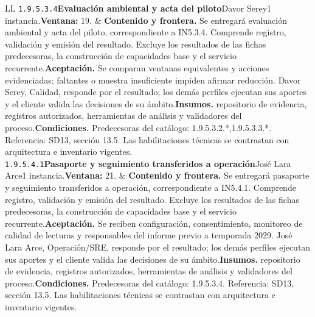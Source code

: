 \begin{longtable}{L{\tabcolsep\relax}L{\tabcolsep\relax}}
\texttt{1.\allowbreak{}9.\allowbreak{}5.\allowbreak{}3.\allowbreak{}4}\newline{}\textbf{Evaluación ambiental y acta del piloto}\newline{}Davor Serey\newline{}1 instancia.\newline{}\textbf{Ventana:} 19. & \textbf{Contenido y frontera.} Se entregará evaluación ambiental y acta del piloto, correspondiente a IN5.3.4. Comprende registro, validación y emisión del resultado. Excluye los resultados de las fichas predecesoras, la construcción de capacidades base y el servicio recurrente.\newline{}\textbf{Aceptación.} Se comparan ventanas equivalentes y acciones evidenciadas; faltantes o muestra insuficiente impiden afirmar reducción. Davor Serey, Calidad, responde por el resultado; los demás perfiles ejecutan sus aportes y el cliente valida las decisiones de su ámbito.\newline{}\textbf{Insumos.} repositorio de evidencia, registros autorizados, herramientas de análisis y validadores del proceso.\newline{}\textbf{Condiciones.} Predecesoras del catálogo: 1.9.5.3.2.*,1.9.5.3.3.*. Referencia: SD13, sección 13.5. Las habilitaciones técnicas se contrastan con arquitectura e inventario vigentes.\\\hline
\texttt{1.\allowbreak{}9.\allowbreak{}5.\allowbreak{}4.\allowbreak{}1}\newline{}\textbf{Pasaporte y seguimiento transferidos a operación}\newline{}José Lara Arce\newline{}1 instancia.\newline{}\textbf{Ventana:} 21. & \textbf{Contenido y frontera.} Se entregará pasaporte y seguimiento transferidos a operación, correspondiente a IN5.4.1. Comprende registro, validación y emisión del resultado. Excluye los resultados de las fichas predecesoras, la construcción de capacidades base y el servicio recurrente.\newline{}\textbf{Aceptación.} Se reciben configuración, consentimiento, monitoreo de calidad de lecturas y responsables del informe previo a temporada 2029. José Lara Arce, Operación/SRE, responde por el resultado; los demás perfiles ejecutan sus aportes y el cliente valida las decisiones de su ámbito.\newline{}\textbf{Insumos.} repositorio de evidencia, registros autorizados, herramientas de análisis y validadores del proceso.\newline{}\textbf{Condiciones.} Predecesoras del catálogo: 1.9.5.3.4. Referencia: SD13, sección 13.5. Las habilitaciones técnicas se contrastan con arquitectura e inventario vigentes.\\\hline
\end{longtable}\endgroup
